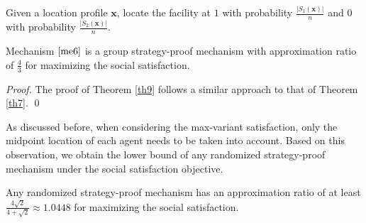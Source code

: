 \documentclass[runningheads]{11llncst}
\begin{document}
\begin{mechanism} \label{me6}
	 Given a location profile $\textbf{x}$, locate the facility at  $1$ with probability $\frac{|S_1(\textbf{x})|}{n}$ and $0$ with probability $\frac{|S_2(\textbf{x})|}{n}$. 
\end{mechanism}

\begin{theorem}\label{th9}
	Mechanism $\ref{me6}$ is   a group strategy-proof  mechanism with approximation ratio of $\frac{4}{3}$ for maximizing the social satisfaction. 
\end{theorem}
\begin{proof}
    The proof of Theorem \ref{th9} follows a similar approach to that of Theorem \ref{th7}. \qed
\end{proof}

As discussed before, when considering the max-variant satisfaction, only the midpoint location of each agent needs to be taken into account. Based on this observation, we obtain the lower bound  of any randomized strategy-proof mechanism under the social satisfaction objective.

\begin{theorem}\label{th5}
		Any  randomized strategy-proof mechanism has an approximation ratio of at least $\frac{4\sqrt{2}}{4+\sqrt{2}}\approx1.0448$ for maximizing the social satisfaction. 
\end{theorem}
\end{document}
